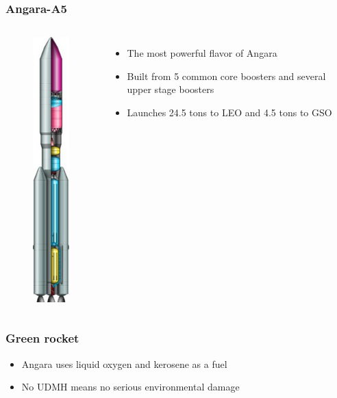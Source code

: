 \documentclass[onlymath]{beamer}
\newcommand\tw\textwidth
\begin{document}
\begin{frame}
  \frametitle{Angara-A5}
  \begin{columns}
    \column{.2\tw}
    \begin{figure}
      \centering
      \includegraphics[scale=0.4]{Angara-A5-scheme.jpg}
    \end{figure}
    \column{.8\tw}
    \begin{itemize}
    \item The most powerful flavor of Angara
    \item Built from 5 common core boosters and several upper stage
      boosters
    \item Launches 24.5 tons to LEO and 4.5 tons to GSO
    \end{itemize}
  \end{columns}

\end{frame}

\begin{frame}
  \frametitle{Green rocket}
  \begin{itemize}
  \item Angara uses liquid oxygen and kerosene as a fuel
  \item No UDMH means no serious environmental damage
  \end{itemize}
\end{frame}
\end{document}
